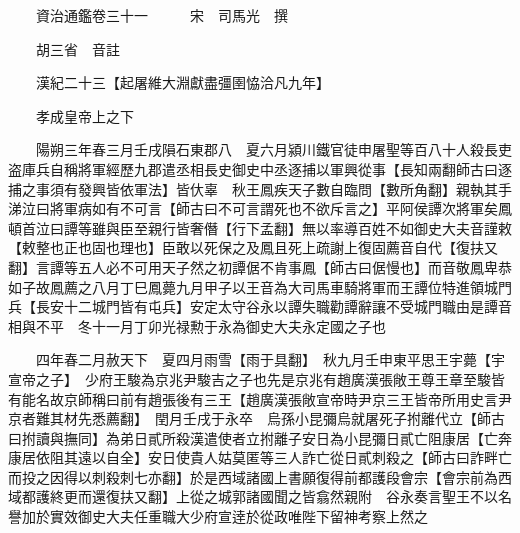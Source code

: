 










 


 
 


 

  
  
  
  
  





  
  
  
  
  
 
  

  

  
  
  



  

 
 

  
   




  

  
  


  　　資治通鑑卷三十一　　　宋　司馬光　撰

　　胡三省　音註

　　漢紀二十三【起屠維大淵獻盡彊圉恊洽凡九年】

　　孝成皇帝上之下

　　陽朔三年春三月壬戌隕石東郡八　夏六月潁川鐵官徒申屠聖等百八十人殺長吏盗庫兵自稱將軍經歷九郡遣丞相長史御史中丞逐捕以軍興從事【長知兩翻師古曰逐捕之事須有發興皆依軍法】皆㐲辜　秋王鳳疾天子數自臨問【數所角翻】親執其手涕泣曰將軍病如有不可言【師古曰不可言謂死也不欲斥言之】平阿侯譚次將軍矣鳳頓首泣曰譚等雖與臣至親行皆奢僭【行下孟翻】無以率導百姓不如御史大夫音謹敕【敕整也正也固也理也】臣敢以死保之及鳳且死上疏謝上復固薦音自代【復扶又翻】言譚等五人必不可用天子然之初譚倨不肯事鳳【師古曰倨慢也】而音敬鳳卑恭如子故鳳薦之八月丁巳鳳薨九月甲子以王音為大司馬車騎將軍而王譚位特進領城門兵【長安十二城門皆有屯兵】安定太守谷永以譚失職勸譚辭讓不受城門職由是譚音相與不平　冬十一月丁卯光禄勲于永為御史大夫永定國之子也

　　四年春二月赦天下　夏四月雨雪【雨于具翻】　秋九月壬申東平思王宇薨【宇宣帝之子】　少府王駿為京兆尹駿吉之子也先是京兆有趙廣漢張敞王尊王章至駿皆有能名故京師稱曰前有趙張後有三王【趙廣漢張敞宣帝時尹京三王皆帝所用史言尹京者難其材先悉薦翻】　閏月壬戌于永卒　烏孫小昆彌烏就屠死子拊離代立【師古曰拊讀與撫同】為弟日貳所殺漢遣使者立拊離子安日為小昆彌日貳亡阻康居【亡奔康居依阻其遠以自全】安日使貴人姑莫匿等三人詐亡從日貳刺殺之【師古曰詐畔亡而投之因得以刺殺刺七亦翻】於是西域諸國上書願復得前都護段會宗【會宗前為西域都護終更而還復扶又翻】上從之城郭諸國聞之皆翕然親附　谷永奏言聖王不以名譽加於實效御史大夫任重職大少府宣逹於從政唯陛下留神考察上然之

